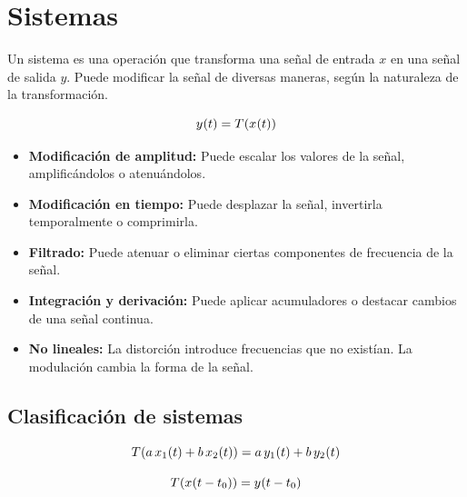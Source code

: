 \chapter{Sistemas}

Un sistema es una operación que transforma una señal de entrada $x$ en una señal de salida $y$.
Puede modificar la señal de diversas maneras, según la naturaleza de la transformación.

\begin{mdframed}[style=DefinitionFrame]
    \begin{defn}
    \end{defn}
    \cusTe{}
    \[
        \fx[y]{t} = \fx[T]{\fx[x]{t}}
    \]
\end{mdframed}

\begin{itemize}
    \item
    \textbf{Modificación de amplitud:}
    Puede escalar los valores de la señal, amplificándolos o atenuándolos.
    \item
    \textbf{Modificación en tiempo:}
    Puede desplazar la señal, invertirla temporalmente o comprimirla.
    \item
    \textbf{Filtrado:}
    Puede atenuar o eliminar ciertas componentes de frecuencia de la señal.
    \item
    \textbf{Integración y derivación:}
    Puede aplicar acumuladores o destacar cambios de una señal continua.
    \item
    \textbf{No lineales:}
    La distorción introduce frecuencias que no existían.
    La modulación cambia la forma de la señal.
\end{itemize}

\section{Clasificación de sistemas}

\begin{mdframed}[style=DefinitionFrame]
    \begin{defn}
    \end{defn}
    \[
        \fx[T]{a \, \fx[x_1]{t} + b \, \fx[x_2]{t}} = a \, \fx[y_1]{t} + b \, \fx[y_2]{t}
    \]
\end{mdframed}

\begin{mdframed}[style=DefinitionFrame]
    \begin{defn}
    \end{defn}
    \[
        \fx[T]{\fx[x]{t-t_0}} =\fx[y]{t-t_0}
    \]
\end{mdframed}

